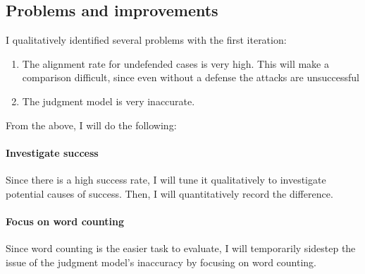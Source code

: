 \subsection{Problems and improvements}
I qualitatively identified several problems with the first iteration:
\begin{enumerate}
    \item The alignment rate for undefended cases is very high. This will make a
        comparison difficult, since even without a defense the attacks are
        unsuccessful
    \item The judgment model is very inaccurate.
\end{enumerate}

From the above, I will do the following:

\paragraph{Investigate success} Since there is a high success rate, I will tune
it qualitatively to investigate potential causes of success. Then, I will
quantitatively record the difference.

\paragraph{Focus on word counting} Since word counting is the easier task to
evaluate, I will temporarily sidestep the issue of the judgment model's
inaccuracy by focusing on word counting.
